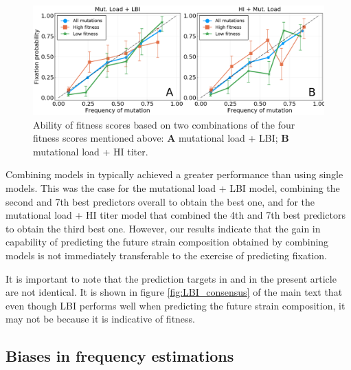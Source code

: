 \documentclass[reprint,amsmath,amssymb,superscriptaddress,showpacs,rmp]{revtex4-1}
\begin{document}
\begin{figure}
	\centering
	\includegraphics[scale=0.5]{Rev_figures/pfix_v_freq_combiJohnsmodels.png}
	\caption{Ability of fitness scores based on two combinations of the four fitness scores mentioned above: \textbf{A} mutational load + LBI; \textbf{B} mutational load + HI titer.}
	\label{fig:pfix_v_freq_combijohnsmodels}
\end{figure}

Combining models in \citep{huddleston_integrating_2020} typically achieved a greater performance than using single models.
This was the case for the mutational load + LBI model, combining the second and 7th best predictors overall to obtain the best one, and for the mutational load + HI titer model that combined the 4th and 7th best predictors to obtain the third best one.
However, our results indicate that the gain in capability of predicting the future strain composition obtained by combining models is not immediately transferable to the exercise of predicting fixation.

It is important to note that the prediction targets in \citep{huddleston_integrating_2020} and in the present article are not identical.
It is shown in figure \ref{fig:LBI_consensus} of the main text that even though LBI performs well when predicting the future strain composition, it may not be because it is indicative of fitness.






\subsection{Biases in frequency estimations} %
\label{sub:biases_in_frequency_estimations}
\end{document}
